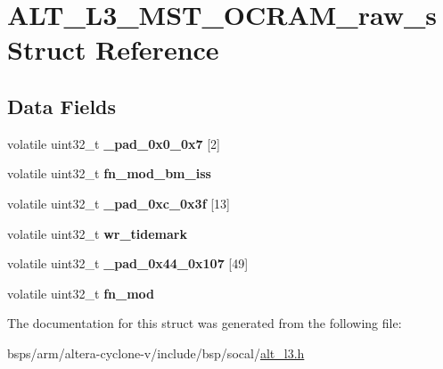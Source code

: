 \hypertarget{structALT__L3__MST__OCRAM__raw__s}{}\section{A\+L\+T\+\_\+\+L3\+\_\+\+M\+S\+T\+\_\+\+O\+C\+R\+A\+M\+\_\+raw\+\_\+s Struct Reference}
\label{structALT__L3__MST__OCRAM__raw__s}
\subsection*{Data Fields}
\begin{DoxyCompactItemize}
\item 
\mbox{\label{structALT__L3__MST__OCRAM__raw__s_a2f0c75d927ca02de2bc6d2d7f43c010d}} 
volatile uint32\+\_\+t {\bfseries \+\_\+pad\+\_\+0x0\+\_\+0x7} \mbox{[}2\mbox{]}
\item 
\mbox{\label{structALT__L3__MST__OCRAM__raw__s_a0782948f9f3832583dcd910d2b87e44b}} 
volatile uint32\+\_\+t {\bfseries fn\+\_\+mod\+\_\+bm\+\_\+iss}
\item 
\mbox{\label{structALT__L3__MST__OCRAM__raw__s_a70c793b158880e63a337fcd314bd8e28}} 
volatile uint32\+\_\+t {\bfseries \+\_\+pad\+\_\+0xc\+\_\+0x3f} \mbox{[}13\mbox{]}
\item 
\mbox{\label{structALT__L3__MST__OCRAM__raw__s_a793de4495c5f62c8adb7dc50b182eef5}} 
volatile uint32\+\_\+t {\bfseries wr\+\_\+tidemark}
\item 
\mbox{\label{structALT__L3__MST__OCRAM__raw__s_a439b068a680bbb903d6480325eab2936}} 
volatile uint32\+\_\+t {\bfseries \+\_\+pad\+\_\+0x44\+\_\+0x107} \mbox{[}49\mbox{]}
\item 
\mbox{\label{structALT__L3__MST__OCRAM__raw__s_acf1c3228785d328b42ba294636733cf7}} 
volatile uint32\+\_\+t {\bfseries fn\+\_\+mod}
\end{DoxyCompactItemize}


The documentation for this struct was generated from the following file\+:\begin{DoxyCompactItemize}
\item 
bsps/arm/altera-\/cyclone-\/v/include/bsp/socal/\mbox{\hyperlink{alt__l3_8h}{alt\+\_\+l3.\+h}}\end{DoxyCompactItemize}
